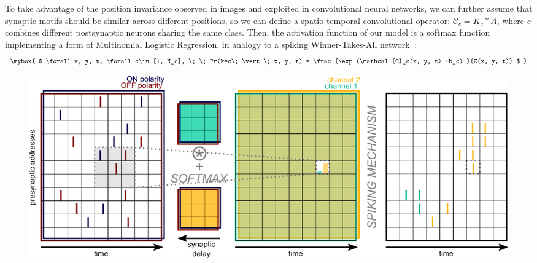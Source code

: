 \documentclass[landscape,a0]{a0poster}
\newcommand{\bias}{b} %
\newcommand{\timev}{t} %
\newcommand{\kernel}{K} %
\newcommand{\class}{c} %
\begin{document}
\begin{multicols}{3}
To take advantage of the position invariance observed in images and exploited in convolutional neural networks, we can further assume that synaptic motifs should be similar across different positions, so we can define a spatio-temporal convolutional operator: $\mathcal{C}_\class = \kernel_\class \ast A$, where $\class$ combines different postsynaptic neurons sharing the same class. Then, the activation function of our model is a softmax function implementing a form of Multinomial Logistic Regression, in analogy to a spiking Winner-Takes-All network~\cite{nessler_bayesian_2013}:
$$
\mybox{
$ \forall x, y, \timev, \forall \class \in [1, N_\class], \; \;
Pr(k=\class \; \vert \;  x, y, \timev) =
\frac {\exp  (\mathcal{C}_\class(x, y, \timev) +\bias_\class) }{Z(x, y, \timev)}
$
}
$$
%
\begin{figure}[H]
    \centering
    \includegraphics[width=\linewidth]{figures/HDSNN_conv.pdf}
    \caption{
}
\end{figure}
\end{multicols}
\end{document}
